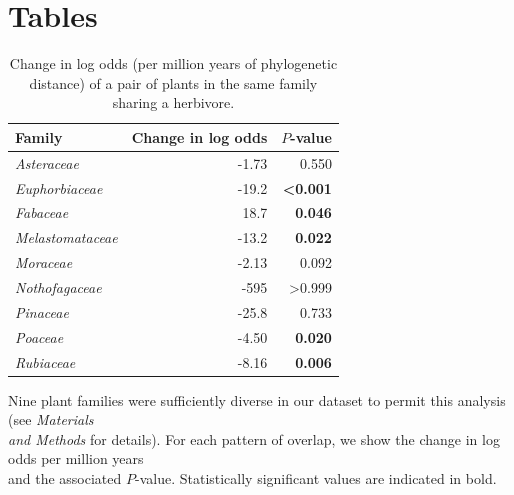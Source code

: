 \documentclass[12pt]{article}
\begin{document}
\newpage

\renewcommand*{\bibfont}{\raggedright}



\newpage
\section*{Tables}

  \begin{table}[!h]
  \caption{\small Change in log odds (per million years of phylogenetic distance) of a pair of plants in the same family sharing a herbivore.}
  \label{family_slopes_ph}
  \begin{tabular}{|l  rr|}
  \hline
    Family & Change in log odds & $P$-value \\
    \hline
    \emph{Asteraceae} & -1.73 &  0.550 \\
    \emph{Euphorbiaceae} & -19.2 & \textbf{\textless0.001} \\
    \emph{Fabaceae} & 18.7 &  \textbf{0.046} \\
    \emph{Melastomataceae} & -13.2 & \textbf{0.022} \\
    \emph{Moraceae} & -2.13 & 0.092 \\
    \emph{Nothofagaceae} & -595 & \textgreater{0.999} \\
    \emph{Pinaceae} &  -25.8 & 0.733 \\
    \emph{Poaceae} & -4.50 & \textbf{0.020} \\
    \emph{Rubiaceae} & -8.16 &  \textbf{0.006} \\
  \hline
  \end{tabular}
  \smallskip
  \footnotesize

  Nine plant families were sufficiently diverse in our  dataset to permit this analysis
  (see \emph{Materials \\and Methods} for details). For each pattern of overlap, we show the change
  in log odds per million years \\and the associated $P$-value. Statistically significant values are
  indicated in bold. \\

  \end{table}
\end{document}
